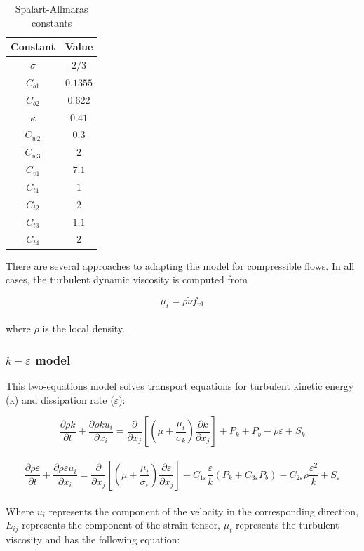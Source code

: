 \documentclass[a5paper]{sapthesis}
\begin{document}
	\begin{table}[h]
		\centering
		\renewcommand{\arraystretch}{1.2} %
		\begin{tabular}{c c}
			\hline
			\textbf{Constant} & \textbf{Value} \\ 
			\hline
			$\sigma$  & $2/3$ \\
			$C_{b1}$  & $0.1355$ \\
			$C_{b2}$  & $0.622$ \\
			$\kappa$  & $0.41$ \\
			$C_{w2}$  & $0.3$ \\
			$C_{w3}$  & $2$ \\
			$C_{v1}$  & $7.1$ \\
			$C_{t1}$  & $1$ \\
			$C_{t2}$  & $2$ \\
			$C_{t3}$  & $1.1$ \\
			$C_{t4}$  & $2$ \\
			\hline
		\end{tabular}
		\caption{Spalart-Allmaras constants}
		\label{table:SAconstants}
	\end{table}
	
	\noindent There are several approaches to adapting the model for compressible flows. In all cases, the turbulent dynamic viscosity is computed from
	
	\begin{equation}
		\mu_t = \rho \tilde{\nu} f_{v1}
	\end{equation}
	\\
	where $\rho$ is the local density.
	
	
	\subsubsection{$k-\varepsilon$ model}
	This two-equations model solves transport equations for turbulent kinetic energy (k) and dissipation rate ($\varepsilon$):
	
	\begin{equation}
		\frac{\partial \rho k}{\partial t} + \frac{\partial \rho k u_i}{\partial x_i} = \frac{\partial}{\partial x_j}\left[\left(\mu +\frac{\mu_t}{\sigma_k}\right)\frac{\partial k}{\partial x_j}\right] + P_k + P_b - \rho \varepsilon + S_k
	\end{equation}
	\\	
	\begin{equation}
		\frac{\partial \rho \varepsilon}{\partial t} + \frac{\partial \rho \varepsilon u_i}{\partial x_i} = \frac{\partial}{\partial x_j}\left[\left(\mu+ \frac{\mu_t}{\sigma_\varepsilon}\right)\frac{\partial \varepsilon}{\partial x_j}\right] + C_{1 \varepsilon}\frac{\varepsilon}{k} (P_k +C_{3\varepsilon} P_b) - C_{2 \varepsilon}\rho \frac{\varepsilon^2}{k} + S_{\varepsilon
		}
	\end{equation}
	\\
	Where $u_i$ represents the component of the velocity in the corresponding direction, $E_{ij}$ represents the component of the strain tensor, $\mu_t$ represents the turbulent viscosity and has the following equation:
	
\end{document}
